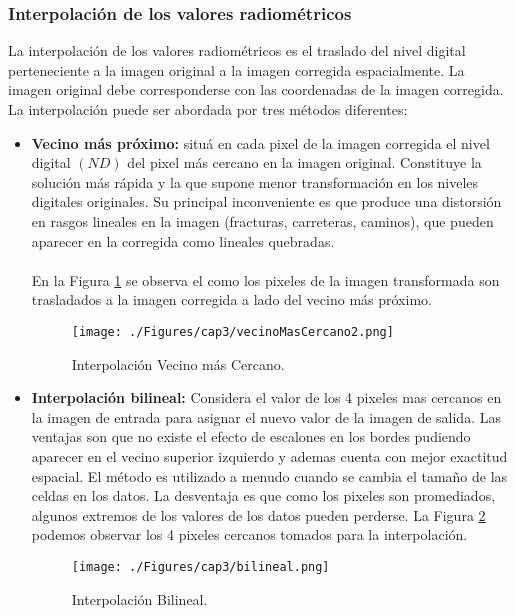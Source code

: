 \subsubsection{Interpolaci\'on de los valores radiom\'etricos}
La interpolaci\'on de los valores radiom\'etricos es el traslado del nivel digital perteneciente a la imagen original a la imagen corregida espacialmente. La imagen original debe corresponderse con las coordenadas de la imagen corregida. La interpolaci\'on puede ser abordada por tres m\'etodos diferentes:
	\begin{itemize}
		\item \textbf{Vecino m\'as pr\'oximo:} situ\'a en cada pixel de la imagen corregida el nivel digital $ (ND) $ del pixel m\'as cercano en la imagen original. Constituye la soluci\'on m\'as r\'apida y la que supone menor transformaci\'on en los niveles digitales originales. Su principal inconveniente es que produce una distorsi\'on en rasgos lineales en la imagen (fracturas, carreteras, caminos), que pueden aparecer en la corregida como lineales quebradas. \\~\\
En la Figura \ref{fig:vecinoMasCercano2} se observa el como los pixeles de la imagen transformada son trasladados a la imagen corregida a lado del vecino m\'as pr\'oximo.
				    \begin{figure}[H]
				    	\centering
				    	\texttt{[image: ./Figures/cap3/vecinoMasCercano2.png]}
				    	\caption{Interpolaci\'on Vecino m\'as Cercano.}
				    	\label{fig:vecinoMasCercano2}
				    \end{figure}
		
		\item \textbf{Interpolaci\'on bilineal:} Considera el valor de los 4 pixeles mas cercanos en la imagen de entrada para asignar el nuevo valor de la imagen de salida. Las ventajas son que no existe el efecto de escalones en los bordes pudiendo aparecer en el vecino superior izquierdo y ademas cuenta con mejor exactitud espacial. El m\'etodo es utilizado a menudo cuando se cambia el tama\~{n}o de las celdas en los datos. La desventaja es que como los pixeles son promediados, algunos extremos de los valores de los datos pueden perderse. La Figura \ref{fig:bilineal2} podemos observar los 4 pixeles cercanos tomados para la interpolaci\'on.
		\begin{figure}[H]
			\centering
			\texttt{[image: ./Figures/cap3/bilineal.png]}
			\caption{Interpolaci\'on Bilineal.}
			\label{fig:bilineal2}
		\end{figure}
		

\end{itemize}
